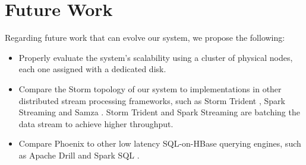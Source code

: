 \section{Future Work}

Regarding future work that can evolve our system, we propose the following:
\begin{itemize}
\item Properly evaluate the system's scalability using a cluster of physical nodes, each one assigned with a dedicated disk.
\item Compare the Storm topology of our system to implementations in other distributed stream processing frameworks, such as Storm Trident \cite{trident}, Spark Streaming \cite{spark_streaming} and Samza \cite{samza}. Storm Trident and Spark Streaming are batching the data stream to achieve higher throughput.
\item Compare Phoenix to other low latency SQL-on-HBase querying engines, such as Apache Drill \cite{drill} and Spark SQL \cite{spark_sql}.
\end{itemize}


\cleardoublepage

